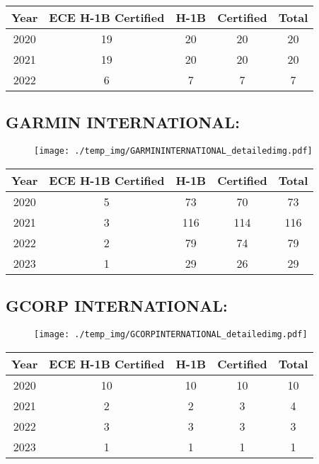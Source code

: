 \documentclass{article}%
\begin{document}
%
\begin{longtable}{c|c|c|c|c}%
\hline%
Year&ECE H{-}1B Certified&H{-}1B&Certified&Total\\%
\hline%
2020&19&20&20&20\\%
\hline%
2021&19&20&20&20\\%
\hline%
2022&6&7&7&7\\%
\hline%
\end{longtable}

%
\newpage%
\subsection{GARMIN INTERNATIONAL:}%
\label{subsec:GARMININTERNATIONAL}%
\label{GARMININTERNATIONALdetailed}%


\begin{figure}[htbp]%
\centering%
\texttt{[image: ./temp\_img/GARMININTERNATIONAL\_detailedimg.pdf]}%
\end{figure}

%
\begin{longtable}{c|c|c|c|c}%
\hline%
Year&ECE H{-}1B Certified&H{-}1B&Certified&Total\\%
\hline%
2020&5&73&70&73\\%
\hline%
2021&3&116&114&116\\%
\hline%
2022&2&79&74&79\\%
\hline%
2023&1&29&26&29\\%
\hline%
\end{longtable}

%
\newpage%
\subsection{GCORP INTERNATIONAL:}%
\label{subsec:GCORPINTERNATIONAL}%
\label{GCORPINTERNATIONALdetailed}%


\begin{figure}[htbp]%
\centering%
\texttt{[image: ./temp\_img/GCORPINTERNATIONAL\_detailedimg.pdf]}%
\end{figure}

%
\begin{longtable}{c|c|c|c|c}%
\hline%
Year&ECE H{-}1B Certified&H{-}1B&Certified&Total\\%
\hline%
2020&10&10&10&10\\%
\hline%
2021&2&2&3&4\\%
\hline%
2022&3&3&3&3\\%
\hline%
2023&1&1&1&1\\%
\hline%
\end{longtable}
\end{document}
